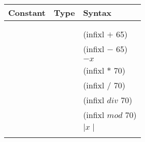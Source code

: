 %
\begin{isabellebody}%
\def\isabellecontext{appendix}%
%
\isadelimtheory
%
\endisadelimtheory
%
\isatagtheory
%
\endisatagtheory
{\isafoldtheory}%
%
\isadelimtheory
%
\endisadelimtheory
%
\begin{isamarkuptext}%
\begin{table}[htbp]
\begin{center}
\begin{tabular}{lll}
Constant & Type & Syntax \\
\hline
\isa{{\isadigit{0}}} & \isa{{\isacharprime}a{\isasymColon}zero} \\
\isa{{\isadigit{1}}} & \isa{{\isacharprime}a{\isasymColon}one} \\
\isa{plus} & \isa{{\isacharprime}a{\isasymColon}plus\ {\isasymRightarrow}\ {\isacharprime}a{\isasymColon}plus\ {\isasymRightarrow}\ {\isacharprime}a{\isasymColon}plus} & (infixl $+$ 65) \\
\isa{minus} & \isa{{\isacharprime}a{\isasymColon}minus\ {\isasymRightarrow}\ {\isacharprime}a{\isasymColon}minus\ {\isasymRightarrow}\ {\isacharprime}a{\isasymColon}minus} & (infixl $-$ 65) \\
\isa{uminus} & \isa{{\isacharprime}a{\isasymColon}uminus\ {\isasymRightarrow}\ {\isacharprime}a{\isasymColon}uminus} & $- x$ \\
\isa{times} & \isa{{\isacharprime}a{\isasymColon}times\ {\isasymRightarrow}\ {\isacharprime}a{\isasymColon}times\ {\isasymRightarrow}\ {\isacharprime}a{\isasymColon}times} & (infixl $*$ 70) \\
\isa{divide} & \isa{{\isacharprime}a{\isasymColon}inverse\ {\isasymRightarrow}\ {\isacharprime}a{\isasymColon}inverse\ {\isasymRightarrow}\ {\isacharprime}a{\isasymColon}inverse} & (infixl $/$ 70) \\
\isa{Divides{\isachardot}div} & \isa{{\isacharprime}a{\isasymColon}div\ {\isasymRightarrow}\ {\isacharprime}a{\isasymColon}div\ {\isasymRightarrow}\ {\isacharprime}a{\isasymColon}div} & (infixl $div$ 70) \\
\isa{Divides{\isachardot}mod} & \isa{{\isacharprime}a{\isasymColon}div\ {\isasymRightarrow}\ {\isacharprime}a{\isasymColon}div\ {\isasymRightarrow}\ {\isacharprime}a{\isasymColon}div} & (infixl $mod$ 70) \\
\isa{abs} & \isa{{\isacharprime}a{\isasymColon}abs\ {\isasymRightarrow}\ {\isacharprime}a{\isasymColon}abs} & ${\mid} x {\mid}$ \\
\isa{sgn} & \isa{{\isacharprime}a{\isasymColon}sgn\ {\isasymRightarrow}\ {\isacharprime}a{\isasymColon}sgn} \\

\end{tabular}
\end{center}
\end{table}
\end{isamarkuptext}
\end{isabellebody}
